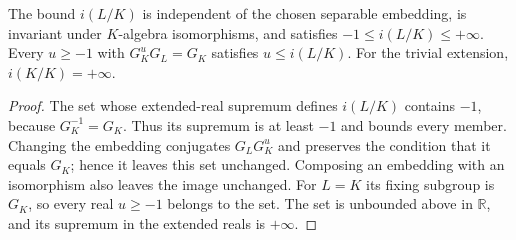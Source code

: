 \begin{lemma}
\label{fw:apf-extended-bound}
\leanok
The bound $i(L/K)$ is independent of the chosen separable embedding,
is invariant under $K$-algebra isomorphisms, and satisfies
$-1\leq i(L/K)\leq+\infty$. Every $u\geq-1$ with
$G_K^uG_L=G_K$ satisfies $u\leq i(L/K)$. For the trivial extension,
$i(K/K)=+\infty$.
\end{lemma}
\begin{proof}
The set whose extended-real supremum defines $i(L/K)$ contains $-1$,
because $G_K^{-1}=G_K$. Thus its supremum is at least $-1$ and bounds
every member. Changing the embedding conjugates $G_LG_K^u$ and
preserves the condition that it equals $G_K$; hence it leaves this set
unchanged. Composing an embedding with an isomorphism also leaves the
image unchanged. For $L=K$ its fixing subgroup is $G_K$, so every
real $u\geq-1$ belongs to the set. The set is unbounded above in
$\mathbb R$, and its supremum in the extended reals is $+\infty$.
\end{proof}

